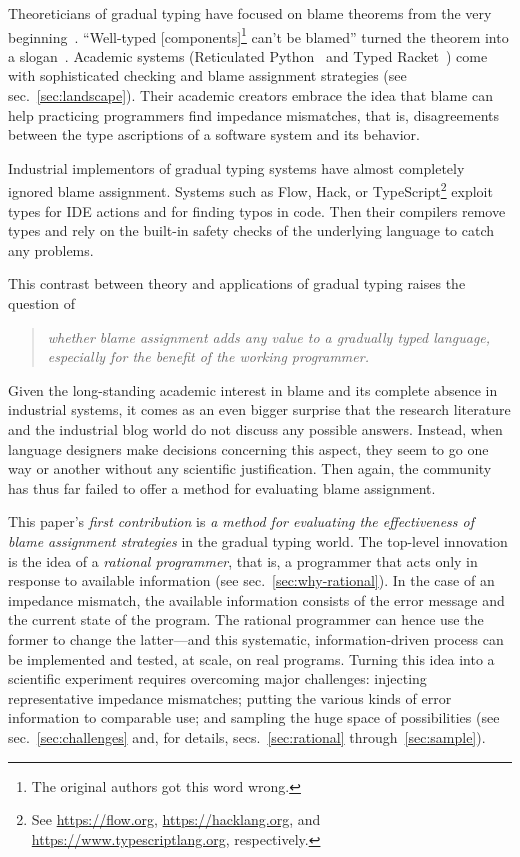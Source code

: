 
Theoreticians of gradual typing have focused on blame theorems from the
very beginning~\citep{mf-toplas-2009, tf-dls-2006}. ``Well-typed
[components]\footnote{The original authors got this word wrong.} can't be
blamed'' turned the theorem into a slogan~\citep{wf-esop-2009}. Academic
systems (Reticulated Python~\citep{vsc-dls-2019, vss-popl-2017,
vksb-dls-2014} and Typed
Racket~\citep{tf-dls-2006,tf-popl-2008,tfffgksst-snapl-2017,tf-icfp-2010})
come with sophisticated checking and blame assignment strategies (see
sec.~\ref{sec:landscape}). Their academic creators embrace the idea that
blame can help practicing programmers find impedance mismatches, that is,
disagreements between the type ascriptions of a software system and its
behavior.

Industrial implementors of gradual typing systems have almost
completely ignored blame assignment.  Systems such as Flow, Hack, or
TypeScript\footnote{See \url{https://flow.org},
\url{https://hacklang.org}, and \url{https://www.typescriptlang.org},
respectively.} exploit types for IDE actions and for finding typos in
code. Then their compilers remove types and rely on the built-in
safety checks of the underlying language to catch any problems.

This contrast between theory and applications of gradual typing raises the question of
\begin{quote}
 \it
 whether blame assignment adds any value to a gradually typed language,
 especially for the benefit of the working programmer.
\end{quote}
Given the long-standing academic interest in blame and its complete absence in
industrial systems, it comes as an even bigger surprise that the research
literature and the industrial blog world do not discuss any possible answers.
Instead, when language designers make decisions concerning this aspect, they seem
to go one way or another without any scientific justification. Then again, the
community has thus far failed to offer a method for evaluating blame assignment.

This paper's {\em first contribution\/} is {\em a method for evaluating the
effectiveness of blame assignment strategies\/} in the gradual typing world.
The top-level innovation is the idea of a {\em rational programmer\/}, that is,
a programmer that acts only in response to available information (see
sec.~\ref{sec:why-rational}). In the case of an impedance mismatch, the
available information consists of the error message and the current state of the
program. The rational programmer can hence use the former to change the
latter---and this systematic, information-driven process can be implemented and
tested, at scale, on real programs.  Turning this idea into a scientific
experiment requires overcoming major challenges: injecting representative
impedance mismatches; putting the various kinds of error information to
comparable use; and sampling the huge space of possibilities (see
sec.~\ref{sec:challenges} and, for details, secs.~\ref{sec:rational} through~\ref{sec:sample}).

